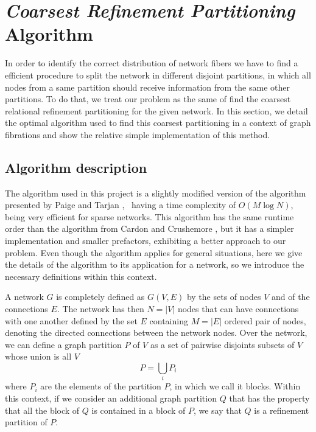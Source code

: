\documentclass[12pt]{diazessay} %
\begin{document}

\section{\textit{Coarsest Refinement Partitioning }Algorithm}

In order to identify the correct distribution of network fibers we have to find a efficient procedure to split the network in different disjoint partitions, in which all nodes from a same partition should receive information from the same other partitions. To do that, we treat our problem as the same of find the coarsest relational refinement partitioning for the given network. In this section, we detail the optimal algorithm used to find this coarsest partitioning in a context of graph fibrations and show the relative simple implementation of this method.

\subsection{Algorithm description}

The algorithm used in this project is a slightly modified version of the algorithm presented by Paige and Tarjan \cite{Tarjan1987}, \ having a time complexity of $O(M\log N)$, being very efficient for sparse networks. This algorithm has the same runtime order than the algorithm from Cardon and Crushemore \cite{Cardon1982}, but it has a simpler implementation and smaller prefactors, exhibiting a better approach to our problem. Even though the algorithm applies for general situations, here we give the details of the algorithm to its application for a network, so we introduce the necessary definitions within this context.

A network $G$ is completely defined as $G(V, E)$ by the sets of nodes $V$ and of the connections $E$. The network has then $N = |V|$ nodes that can have connections with one another defined by the set $E$ containing $M = |E|$ ordered pair of nodes, denoting the directed connections between the network nodes. Over the network, we can define a graph partition $P$ of $V$ as a set of pairwise disjoints subsets of $V$ whose union is all $V$
\begin{equation}
	P = \bigcup_{i} P_i
\end{equation}
where $P_i$ are the elements of the partition $P$, in which we call it blocks. Within this context, if we consider an additional graph partition $Q$ that has the property that all the block of $Q$ is contained in a block of $P$, we say that $Q$ is a refinement partition of $P$.
\end{document}
